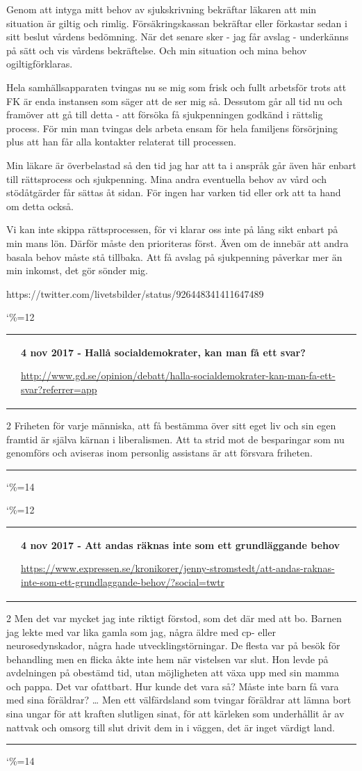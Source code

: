\documentclass[a4paper]{article}
\makeatletter
\newcommand{\entry}{
\catcode`\%=12
\@entry}
\newcommand{\@entry}[4][]{
\bigskip
\begin{tabular*}{\textwidth}{l m{\textwidth-4cm}}
\qrcode{#4} & \textbf{#2}

\medskip

\url{#4}

\end{tabular*}

\medskip


\begin{multicols}{2}
#3
\end{multicols}

#1

\medskip
\hrule

\catcode`\%=14
}
\makeatother
\begin{document}
{{{{{Genom att intyga mitt behov av sjukskrivning bekräftar läkaren att min situation är giltig och rimlig.
Försäkringskassan bekräftar eller förkastar sedan i sitt beslut vårdens bedömning.
När det senare sker - jag får avslag - underkänns på sätt och vis vårdens bekräftelse. Och min situation och mina behov ogiltigförklaras.

Hela samhällsapparaten tvingas nu se mig som frisk och fullt arbetsför trots att FK är enda instansen som säger att de ser mig så.
Dessutom går all tid nu och framöver att gå till detta - att försöka få sjukpenningen godkänd i rättslig process.
För min man tvingas dels arbeta ensam för hela familjens försörjning plus att han får alla kontakter relaterat till processen.

Min läkare är överbelastad så den tid jag har att ta i anspråk går även här enbart till rättsprocess och sjukpenning.
Mina andra eventuella behov av vård och stödåtgärder får sättas åt sidan. För ingen har varken tid eller ork att ta hand om detta också.

Vi kan inte skippa rättsprocessen, för vi klarar oss inte på lång sikt enbart på min mans lön. Därför måste den prioriteras först.
Även om de innebär att andra basala behov måste stå tillbaka. Att få avslag på sjukpenning påverkar mer än min inkomst, det gör sönder mig.
}{https://twitter.com/livetsbilder/status/926448341411647489}

\entry{4 nov 2017 - Hallå socialdemokrater, kan man få ett svar?}{Friheten för varje människa, att få bestämma över sitt eget liv och sin egen framtid är själva kärnan i liberalismen. Att ta strid mot de besparingar som nu genomförs och aviseras inom personlig assistans är att försvara friheten.}{http://www.gd.se/opinion/debatt/halla-socialdemokrater-kan-man-fa-ett-svar?referrer=app}{}

\entry{4 nov 2017 - Att andas räknas inte som ett grundläggande behov}{Men det var mycket jag inte riktigt förstod, som det där med att bo. Barnen jag lekte med var lika gamla som jag, några äldre med cp- eller neurosedynskador, några hade utvecklingstörningar. De flesta var på besök för behandling men en flicka åkte inte hem när vistelsen var slut. Hon levde på avdelningen på obestämd tid, utan möjligheten att växa upp med sin mamma och pappa.
Det var ofattbart. Hur kunde det vara så? Måste inte barn få vara med sina föräldrar?
\ldots
Men ett välfärdsland som tvingar föräldrar att lämna bort sina ungar för att kraften slutligen sinat, för att kärleken som underhållit år av nattvak och omsorg till slut drivit dem in i väggen, det är inget värdigt land.
}{https://www.expressen.se/kronikorer/jenny-stromstedt/att-andas-raknas-inte-som-ett-grundlaggande-behov/?social=twtr}

}}}}
\end{document}
